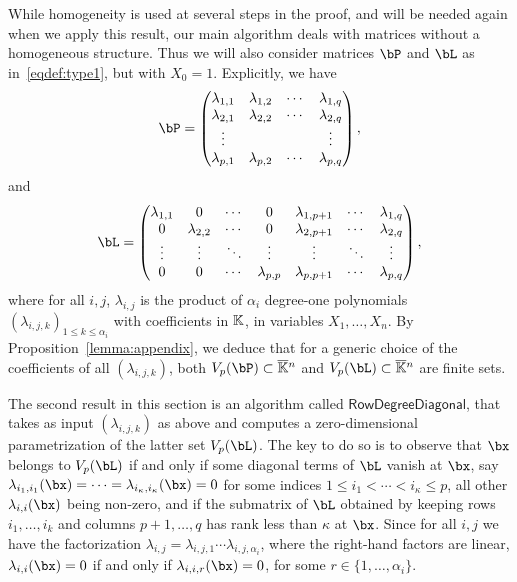 \documentclass[12pt]{article}
\begin{document}
While homogeneity is used at several steps in the proof, and will be
needed again when we apply this result, our main algorithm deals with
matrices without a homogeneous structure. Thus we will also consider 
matrices $\bP$ and $\bL$ as in~\eqref{eqdef:type1}, but with $X_0=1$. Explicitly,
we have
\begin{align}\label{eqdef:type2aff}
  \bP= \left( \begin{matrix}
    \lambda_{1,1} & \lambda_{1,2} & \cdots & \lambda_{1, q}\\
    \lambda_{2,1} &  \lambda_{2,2} & \cdots & \lambda_{2, q}\\
    \vdots & & & \vdots\\
    \lambda_{p,1} &  \lambda_{p,2}& \cdots & \lambda_{p, q}
  \end{matrix} \right),
\end{align}
and
\begin{align}\label{eqdef:type1aff}
\bL= \left( \begin{matrix}
\lambda_{1,1} & 0 & \cdots & 0 & \lambda_{1,p+1} & \cdots & \lambda_{1, q}\\
0 & \lambda_{2,2} & \cdots & 0 & \lambda_{2,p+1} & \cdots & \lambda_{2, q}\\
\vdots & \vdots & \ddots & \vdots & \vdots & \ddots & \vdots\\
0 & 0 & \cdots & \lambda_{p,p} & \lambda_{p,p+1} & \cdots & \lambda_{p, q}
\end{matrix} \right),
\end{align}
where for all $i,j$, $\lambda_{i,j}$ is the product of $\alpha_i$
degree-one polynomials $(\lambda_{i,j,k})_{1 \le k \le \alpha_i}$ with
coefficients in $\mathbb{K}$, in variables $X_1,\dots,X_n$. By
Proposition~\ref{lemma:appendix}, we deduce that for a generic choice
of the coefficients of all $(\lambda_{i,j,k})$, both $V_p(\bP) \subset
\KKbar{}^n$ and $V_p(\bL) \subset \KKbar{}^n$ are finite sets.

The second result in this section is an algorithm called
$\mathsf{RowDegreeDiagonal}$, that takes as input 
$(\lambda_{i,j,k})$ as above and computes a zero-dimensional parametrization of
the latter set $V_p(\bL)$. The key to do so is to observe that $\bx$
belongs to $V_p(\bL)$ if and only if some diagonal terms of $\bL$
vanish at $\bx$, say
$\lambda_{i_1,i_1}(\bx)=\cdots=\lambda_{i_\kappa,i_\kappa}(\bx)=0$ for
some indices $1 \le i_1 < \cdots < i_\kappa \le p$, all other
$\lambda_{i,i}(\bx)$ being non-zero, and if the submatrix of $\bL$
obtained by keeping rows $i_1,\dots,i_k$ and columns $p+1,\dots,q$ has
rank less than $\kappa$ at $\bx$. Since for all $i,j$ we have the
factorization
$\lambda_{i,j}=\lambda_{i,j,1}\cdots\lambda_{i,j,\alpha_i}$, where the
right-hand factors are linear, $\lambda_{i,i}(\bx)=0$ if and only if
$\lambda_{i,i,r}(\bx)=0$, for some $r \in \{1,\dots,\alpha_i\}$.
\end{document}
